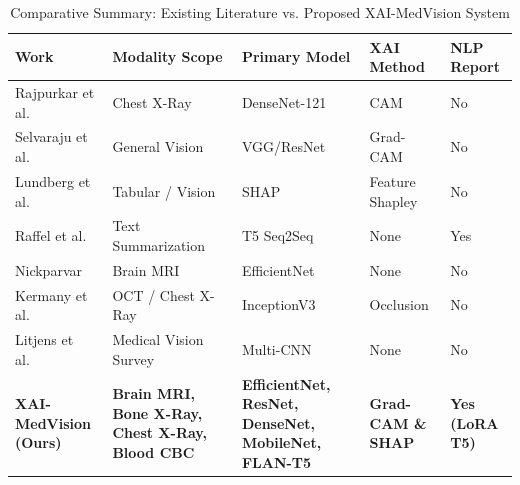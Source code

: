 \documentclass[conference]{IEEEtran}
\begin{document}
\begin{table}[htbp]
\caption{Comparative Summary: Existing Literature vs. Proposed XAI-MedVision System}
\label{tab:litsurvey}
\centering
\setlength{\tabcolsep}{3pt}
\footnotesize
\begin{tabular}{|>{\raggedright\arraybackslash}p{1.8cm}|>{\raggedright\arraybackslash}p{2.2cm}|>{\centering\arraybackslash}p{1.2cm}|>{\centering\arraybackslash}p{1.0cm}|>{\centering\arraybackslash}p{0.8cm}|}
\hline
\textbf{Work} & \textbf{Modality Scope} & \textbf{Primary Model} & \textbf{XAI Method} & \textbf{NLP Report} \\
\hline
Rajpurkar et al.~\cite{b1} & Chest X-Ray & DenseNet-121 & CAM & No \\
Selvaraju et al.~\cite{b2} & General Vision & VGG/ResNet & Grad-CAM & No \\
Lundberg et al.~\cite{b3} & Tabular / Vision & SHAP & Feature Shapley & No \\
Raffel et al.~\cite{b4} & Text Summarization & T5 Seq2Seq & None & Yes \\
Nickparvar~\cite{b9} & Brain MRI & EfficientNet & None & No \\
Kermany et al.~\cite{b13} & OCT / Chest X-Ray & InceptionV3 & Occlusion & No \\
Litjens et al.~\cite{b14} & Medical Vision Survey & Multi-CNN & None & No \\
\hline
\textbf{XAI-MedVision (Ours)} & \textbf{Brain MRI, Bone X-Ray, Chest X-Ray, Blood CBC} & \textbf{EfficientNet, ResNet, DenseNet, MobileNet, FLAN-T5} & \textbf{Grad-CAM \& SHAP} & \textbf{Yes (LoRA T5)} \\
\hline
\end{tabular}
\end{table}

\end{document}
